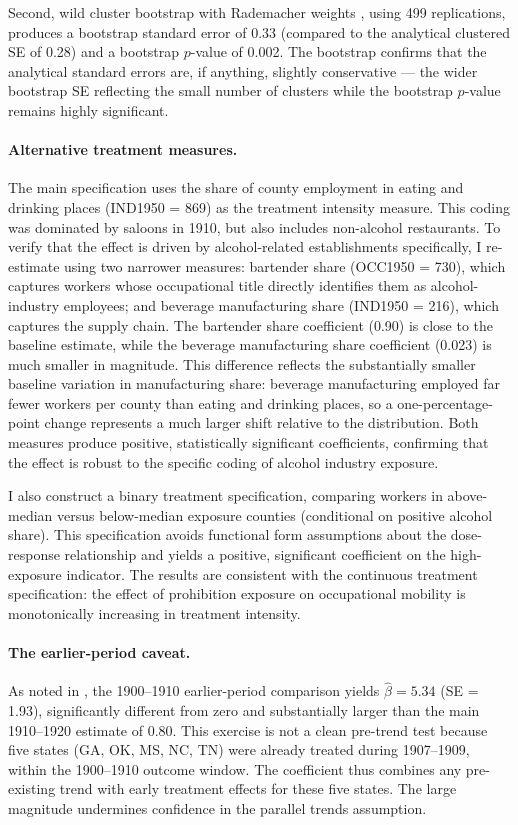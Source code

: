\documentclass[12pt]{article}
\begin{document}
Second, wild cluster bootstrap with Rademacher weights \citep{cameron2008}, using 499 replications, produces a bootstrap standard error of 0.33 (compared to the analytical clustered SE of 0.28) and a bootstrap $p$-value of 0.002. The bootstrap confirms that the analytical standard errors are, if anything, slightly conservative --- the wider bootstrap SE reflecting the small number of clusters while the bootstrap $p$-value remains highly significant.

\paragraph{Alternative treatment measures.} The main specification uses the share of county employment in eating and drinking places (IND1950 = 869) as the treatment intensity measure. This coding was dominated by saloons in 1910, but also includes non-alcohol restaurants. To verify that the effect is driven by alcohol-related establishments specifically, I re-estimate using two narrower measures: bartender share (OCC1950 = 730), which captures workers whose occupational title directly identifies them as alcohol-industry employees; and beverage manufacturing share (IND1950 = 216), which captures the supply chain. The bartender share coefficient (0.90) is close to the baseline estimate, while the beverage manufacturing share coefficient (0.023) is much smaller in magnitude. This difference reflects the substantially smaller baseline variation in manufacturing share: beverage manufacturing employed far fewer workers per county than eating and drinking places, so a one-percentage-point change represents a much larger shift relative to the distribution. Both measures produce positive, statistically significant coefficients, confirming that the effect is robust to the specific coding of alcohol industry exposure.

I also construct a binary treatment specification, comparing workers in above-median versus below-median exposure counties (conditional on positive alcohol share). This specification avoids functional form assumptions about the dose-response relationship and yields a positive, significant coefficient on the high-exposure indicator. The results are consistent with the continuous treatment specification: the effect of prohibition exposure on occupational mobility is monotonically increasing in treatment intensity.

\paragraph{The earlier-period caveat.} As noted in , the 1900--1910 earlier-period comparison yields $\hat{\beta} = 5.34$ (SE = 1.93), significantly different from zero and substantially larger than the main 1910--1920 estimate of 0.80. This exercise is not a clean pre-trend test because five states (GA, OK, MS, NC, TN) were already treated during 1907--1909, within the 1900--1910 outcome window. The coefficient thus combines any pre-existing trend with early treatment effects for these five states. The large magnitude undermines confidence in the parallel trends assumption.
\end{document}
